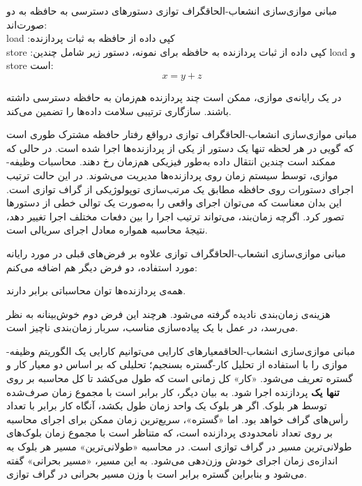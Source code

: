 \begin{itemframe-s}{مبانی موازی‌سازی انشعاب-الحاق}{گراف توازی}
\itm
دستورهای دسترسی به حافظه به دو صورت‌اند:\\
load
:کپی داده از حافظه به ثبات پردازنده \\
store
:کپی داده از ثبات پردازنده به حافظه
\itm
برای نمونه، دستور زیر شامل چندین load و store است:
$$x = y + z$$

\itm
در یک رایانه‌ی موازی، ممکن است چند پردازنده هم‌زمان به حافظه دسترسی داشته باشند. سازگاری ترتیبی سلامت داده‌ها را تضمین می‌کند.
\end{itemframe-s}


\begin{itemframe-s}{مبانی موازی‌سازی انشعاب-الحاق}{گراف توازی}
\itm
درواقع رفتار حافظه مشترک طوری است که گویی در هر لحظه تنها یک دستور از یکی از پردازنده‌ها اجرا شده است.
در حالی که ممکند است چندین انتقال داده به‌طور فیزیکی هم‌زمان رخ دهند.
\itm
محاسبات وظیفه-موازی، توسط سیستم زمان‌ روی پردازنده‌ها مدیریت می‌شوند. در این حالت ترتیب اجرای دستورات روی حافظه‌ مطابق یک مرتب‌سازی توپولوژیکی از گراف توازی است.
\itm
این بدان معناست که می‌توان اجرای واقعی را به‌صورت یک توالی خطی از دستورها تصور کرد.
اگرچه زمان‌بند، می‌تواند ترتیب اجرا را بین دفعات مختلف اجرا تغییر دهد، نتیجهٔ محاسبه همواره معادل اجرای سریالی است.

\end{itemframe-s}


\begin{itemframe-s}{مبانی موازی‌سازی انشعاب-الحاق}{گراف توازی}
\itm
علاوه بر فرض‌های قبلی در مورد رایانه مورد استفاده، دو فرض دیگر هم اضافه می‌کنم:
\item[1]
همه‌ی پردازنده‌ها توان محاسباتی برابر دارند.
\item[2]
هزینه‌ی زمان‌بندی نادیده گرفته می‌شود.
\itm
هرچند این فرض دوم خوش‌بینانه به نظر می‌رسد، در عمل با یک پیاده‌سازی مناسب، سربار زمان‌بندی ناچیز است.

\end{itemframe-s}


\begin{itemframe-s}{مبانی موازی‌سازی انشعاب-الحاق}{معیارهای کارایی}
\itm
می‌توانیم کارایی یک الگوریتم وظیفه-موازی را با استفاده از تحلیل کار-گستره
بسنجیم؛ تحلیلی که بر اساس دو معیار کار
و گستره
تعریف می‌شود.
\itm
«کار» کل زمانی است که طول می‌کشد تا کل محاسبه بر روی
\textbf{تنها یک}
پردازنده اجرا شود. به بیان دیگر، کار برابر است با مجموع زمان صرف‌شده توسط هر بلوک. اگر هر بلوک یک واحد زمان طول بکشد، آنگاه کار برابر با تعداد رأس‌های گراف خواهد بود.
\itm
اما «گستره»، سریع‌ترین زمان ممکن برای اجرای محاسبه بر روی تعداد نامحدودی پردازنده است، که متناظر است با مجموع زمان بلوک‌های طولانی‌ترین مسیر در گراف توازی است.
در محاسبه «طولانی‌ترین» مسیر هر بلوک به اندازه‌ی زمان اجرای خودش وزن‌دهی می‌شود.
به این مسیر، «مسیر بحرانی» گفته می‌شود و بنابراین گستره برابر است با وزن مسیر بحرانی
در گراف توازی.
\end{itemframe-s}


